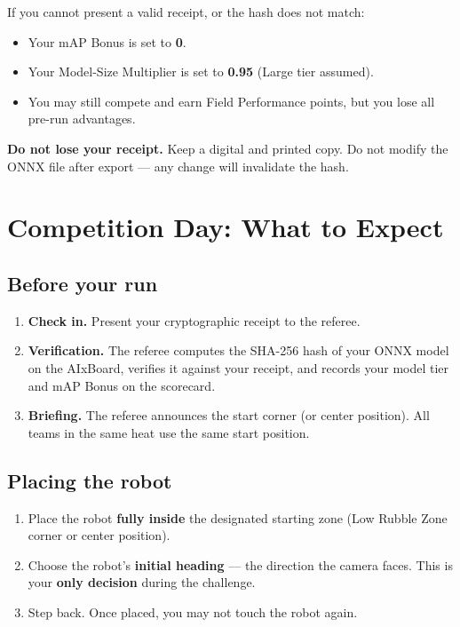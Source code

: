 \documentclass[a4]{article}
\begin{document}
If you cannot present a valid receipt, or the hash does not match:
\begin{itemize}
    \item Your mAP Bonus is set to \textbf{0}.
    \item Your Model-Size Multiplier is set to \textbf{0.95} (Large tier assumed).
    \item You may still compete and earn Field Performance points, but you lose all pre-run advantages.
\end{itemize}

\begin{framed}
\textbf{Do not lose your receipt.} Keep a digital and printed copy. Do not modify the ONNX file after export --- any change will invalidate the hash.
\end{framed}

\pagebreak
\section*{Competition Day: What to Expect}

\subsection*{Before your run}

\begin{enumerate}
    \item \textbf{Check in.} Present your cryptographic receipt to the referee.
    \item \textbf{Verification.} The referee computes the SHA-256 hash of your ONNX model on the AIxBoard, verifies it against your receipt, and records your model tier and mAP Bonus on the scorecard.
    \item \textbf{Briefing.} The referee announces the start corner (or center position). All teams in the same heat use the same start position.
\end{enumerate}

\subsection*{Placing the robot}

\begin{enumerate}
    \item Place the robot \textbf{fully inside} the designated starting zone (Low Rubble Zone corner or center position).
    \item Choose the robot's \textbf{initial heading} --- the direction the camera faces. This is your \textbf{only decision} during the challenge.
    \item Step back. Once placed, you may not touch the robot again.
\end{enumerate}
\end{document}
